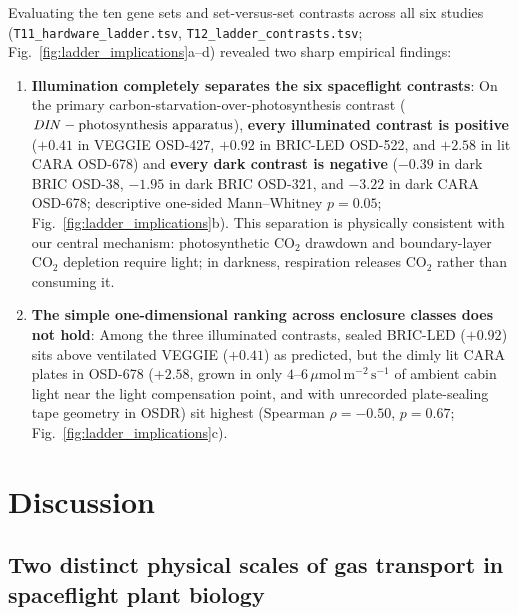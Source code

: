 \documentclass[final,5p,times,twocolumn,numbers,sort&compress]{elsarticle}
\newcommand{\ums}{\ensuremath{\mu\mathrm{mol\,m^{-2}\,s^{-1}}}}
\begin{document}
Evaluating the ten gene sets and set-versus-set contrasts across all six studies (\texttt{T11\_hardware\_ladder.tsv}, \texttt{T12\_ladder\_contrasts.tsv}; Fig.~\ref{fig:ladder_implications}a--d) revealed two sharp empirical findings:
\begin{enumerate}
    \item \textbf{Illumination completely separates the six spaceflight contrasts}: On the primary carbon-starvation-over-photosynthesis contrast ($\text{\textit{DIN}} - \text{photosynthesis apparatus}$), \textbf{every illuminated contrast is positive} ($+0.41$ in VEGGIE OSD-427, $+0.92$ in BRIC-LED OSD-522, and $+2.58$ in lit CARA OSD-678) and \textbf{every dark contrast is negative} ($-0.39$ in dark BRIC OSD-38, $-1.95$ in dark BRIC OSD-321, and $-3.22$ in dark CARA OSD-678; descriptive one-sided Mann--Whitney $p = 0.05$; Fig.~\ref{fig:ladder_implications}b). This separation is physically consistent with our central mechanism: photosynthetic $\mathrm{CO_2}$ drawdown and boundary-layer $\mathrm{CO_2}$ depletion require light; in darkness, respiration releases $\mathrm{CO_2}$ rather than consuming it.
    \item \textbf{The simple one-dimensional ranking across enclosure classes does not hold}: Among the three illuminated contrasts, sealed BRIC-LED ($+0.92$) sits above ventilated VEGGIE ($+0.41$) as predicted, but the dimly lit CARA plates in OSD-678 ($+2.58$, grown in only $4\text{--}6\,\ums$ of ambient cabin light near the light compensation point, and with unrecorded plate-sealing tape geometry in OSDR) sit highest (Spearman $\rho = -0.50$, $p = 0.67$; Fig.~\ref{fig:ladder_implications}c).
\end{enumerate}

\section{Discussion}\label{sec:discussion}

\subsection{Two distinct physical scales of gas transport in spaceflight plant biology}
\end{document}
